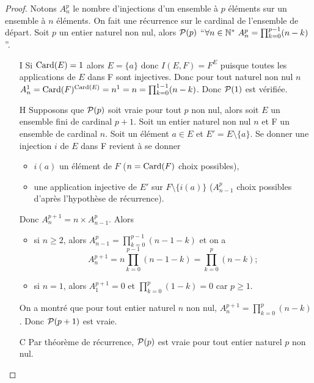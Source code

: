 \begin{proof}
  Notons \(A_n^p\) le nombre d'injections d'un ensemble à \(p\) éléments sur un
  ensemble à \(n\) éléments. On fait une récurrence sur le cardinal de
  l'ensemble de départ. Soit \(p\) un entier naturel non nul, alors \(\P(p)\)
  ``\(\forall n \in \N^* \ A_n^p = \prod_{k = 0}^{p - 1}(n - k)\)''.
  \begin{itemize}
    \item[I] Si \(\Card(E) = 1\) alors \(E = \{a\}\) donc \(I(E, F) = F^E\)
      puisque toutes les applications de \(E\) dans F sont injectives. Donc pour
      tout naturel non nul \(n\) \(A_n^1 = \Card(F)^{\Card(E)} = n^1 = n =
      \prod_{k = 0}^{1 - 1}(n - k)\).  Donc \(\P(1)\) est vérifiée.
    \item[H] Supposons que \(\P(p)\) soit vraie pour tout \(p\) non nul, alors
      soit \(E\) un ensemble fini de cardinal \(p + 1\). Soit un entier naturel
      non nul \(n\) et F un ensemble de cardinal \(n\). Soit un élément \(a\in
      E\) et \(E' = E\setminus\{a\}\). Se donner une injection \(i\) de \(E\)
      dans F revient à se donner
      \begin{itemize}
        \item \(i(a)\) un élément de \(F\) (\(n = \Card(F)\) choix possibles),
        \item une application injective de \(E'\) sur \(F\setminus\{i(a)\}\)
          (\(A_{n - 1}^p\) choix possibles d'après l'hypothèse de récurrence).
      \end{itemize}
      Donc \(A_{n}^{p + 1} = n \times A_{n - 1}^p\). Alors \begin{itemize}
        \item si \(n\geqslant 2\), alors  \(A_{n - 1}^p = \prod_{k = 0}^{p -
          1}(n - 1 - k)\) et on a
          \begin{equation}
            A_{n}^{p + 1} = n\prod_{k = 0}^{p - 1}(n - 1 - k) = \prod_{k =
            0}^{p}(n - k);
          \end{equation}
        \item si \(n = 1\), alors \(A_{1}^{p + 1} = 0\) et \(\prod_{k = 0}^{p}(1
          - k) = 0\) car \(p\geqslant 1\).
      \end{itemize}
      On a montré que pour tout entier naturel \(n\) non nul, \(A_{n}^{p + 1} =
      \prod_{k = 0}^{p}(n - k)\). Donc \(\P(p + 1)\) est vraie.
    \item[C] Par théorème de récurrence, \(\P(p)\) est vraie pour tout entier
      naturel \(p\) non nul.
  \end{itemize}
\end{proof}

